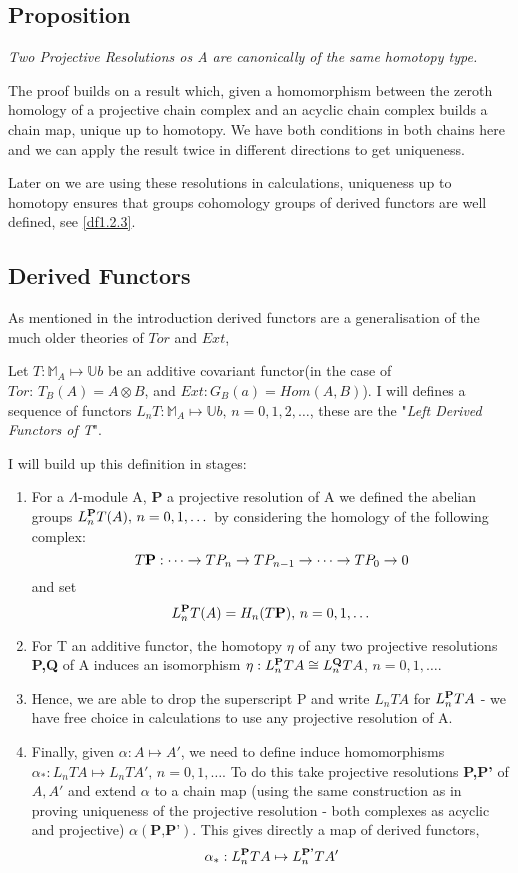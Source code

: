 \subsection{Proposition}\label{df1.3.3}
\emph{Two Projective Resolutions os A are canonically of the same
homotopy type.}

The proof builds on a result which, given a homomorphism between
the zeroth homology of a projective chain complex and an acyclic
chain complex builds a chain map, unique up to homotopy. We have
both conditions in both chains here and we can apply the result
twice in different directions to get uniqueness.

Later on we are using these resolutions in calculations,
uniqueness up to homotopy ensures that groups cohomology groups of
derived functors are well defined, see \ref{df1.2.3}.



\subsection{Derived Functors}\label{df1.4}
As mentioned in the introduction derived functors are a
generalisation of the much older theories of $Tor$ and $Ext$,

Let $T:\mathbb M_A \mapsto \mathbb U b$ be an additive covariant
functor(in the case of $Tor:\,T_B(A) = A\otimes B$, and
$Ext:G_B(a) = Hom(A,B)$). I will defines a sequence of functors
$L_nT:\mathbb M_A\mapsto \mathbb U b,\,n=0,1,2,\dots$, these are
the "\textit{Left Derived Functors of T}".

I will build up this definition in stages:
\begin{enumerate}
    \item For a $\Lambda$-module A, \textbf P a projective
    resolution of A we defined the abelian groups $L^\textbf P_n
    T(A),\, n=0,1,\dots$ by considering the homology of the following complex:
    $$T\textbf P : \dots \rightarrow TP_n\rightarrow TP_{n-1}
    \rightarrow \dots \rightarrow TP_0\rightarrow 0$$
    and set
    $$L_n^\textbf P T(A) = H_n(T \textbf P),\, n=0,1,\dots$$

    \item For T an additive functor, the homotopy $\eta$ of any two
    projective resolutions \textbf{P,Q} of A induces an isomorphism
    $\eta: L_n^\textbf P TA\cong L_n^\textbf Q TA$,
    $n=0,1,\dots$.
    \item Hence, we are able to drop the superscript P and write
    $L_nTA$ for $L_n^\textbf P TA$ - we have free choice in
    calculations to use any projective resolution of A.

    \item   Finally, given $\alpha:A\mapsto A'$, we need to define
    induce homomorphisms $\alpha_*:L_nTA\mapsto L_nTA',\,
    n=0,1,\dots$. To do this take projective resolutions
    \textbf{P,P'} of $A,A'$ and extend $\alpha$ to a chain map
    (using the same construction as in proving uniqueness of the
    projective resolution - both complexes as acyclic and
    projective) $\alpha(\textbf{P,P'})$. This gives directly a map
    of derived functors, $$\alpha_*:L_n^\textbf P TA \mapsto
    L_n^\textbf {P'} TA'$$
\end{enumerate}


